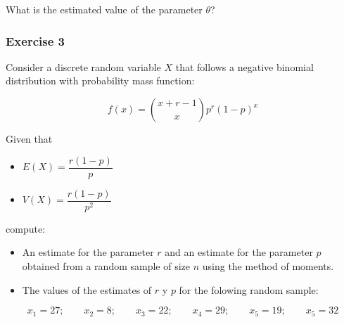 \documentclass[
]{book}
\providecommand{\tightlist}{%
  \setlength{\itemsep}{0pt}\setlength{\parskip}{0pt}}
\begin{document}
What is the estimated value of the parameter \(\theta\)?

\hypertarget{exercise-3-5}{%
\subsubsection{Exercise 3}\label{exercise-3-5}}

Consider a discrete random variable \(X\) that follows a negative binomial distribution with probability mass function:

\[f(x) = \binom{x+r-1}{x}p^r(1-p)^x\]

Given that

\begin{itemize}
\tightlist
\item
  \(E(X)=\dfrac{r(1-p)}{p}\)
\item
  \(V(X) =\dfrac{r(1-p)}{p^2}\)
\end{itemize}

compute:

\begin{itemize}
\item
  An estimate for the parameter \(r\) and an estimate for the parameter \(p\) obtained from a random sample of size \(n\) using the method of moments.
\item
  The values of the estimates of \(r\) y \(p\) for the folowing random sample:
\end{itemize}

\[x_1 = 27; \qquad x_2 = 8; \qquad  x_3 = 22; \qquad  x_4 = 29; \qquad  x_5 = 19; \qquad  x_5 = 32\]

  
\end{document}

